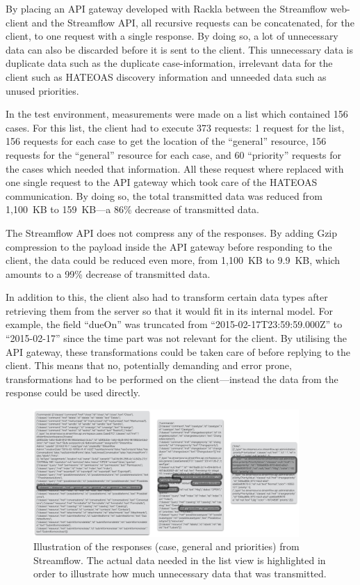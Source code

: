 \documentclass{cslthse-msc}
\begin{document}
By placing an API gateway developed with Rackla between the Streamflow web-client and the Streamflow API, all recursive requests can be concatenated, for the client, to one request with a single response. By doing so, a lot of unnecessary data can also be discarded before it is sent to the client. This unnecessary data is duplicate data such as the duplicate case-information, irrelevant data for the client such as HATEOAS discovery information and unneeded data such as unused priorities.

In the test environment, measurements were made on a list which contained 156 cases. For this list, the client had to execute 373 requests: 1 request for the list, 156 requests for each case to get the location of the \enquote{general} resource, 156 requests for the \enquote{general} resource for each case, and 60 \enquote{priority} requests for the cases which needed that information. All these request where replaced with one single request to the API gateway which took care of the HATEOAS communication. By doing so, the total transmitted data was reduced from 1,100~KB to 159~KB---a 86\% decrease of transmitted data.

The Streamflow API does not compress any of the responses. By adding Gzip compression to the payload inside the API gateway before responding to the client, the data could be reduced even more, from 1,100~KB to 9.9~KB, which amounts to a 99\% decrease of transmitted data.

In addition to this, the client also had to transform certain data types after retrieving them from the server so that it would fit in its internal model. For example, the field \enquote{dueOn} was truncated from \enquote{2015-02-17T23:59:59.000Z} to \enquote{2015-02-17} since the time part was not relevant for the client. By utilising the API gateway, these transformations could be taken care of before replying to the client. This means that no, potentially demanding and error prone, transformations had to be performed on the client---instead the data from the response could be used directly.

\begin{figure}[H]
  \centering
    \begin{center}
      \includegraphics[width=0.9\textwidth]{images/streamflow_response.png}
    \end{center}
  \caption{Illustration of the responses (case, general and priorities) from Streamflow. The actual data needed in the list view is highlighted in order to illustrate how much unnecessary data that was transmitted.}
\end{figure}
\end{document}
